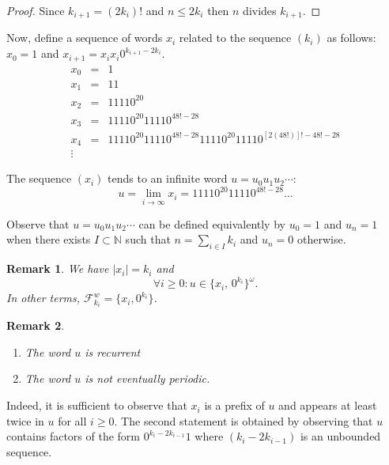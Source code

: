\documentclass[a4 paper,12pt]{article}
\newtheorem{remark}{Remark}[section]
\begin{document}
\begin{proof} Since $k_{i+1}= \left(2k_i\right)!$ and $n\leq 2k_i$ then $n$ divides $k_{i+1}$.  \end{proof}

 Now, define a sequence of words $x_i$ related to the sequence  $(k_i)$ as follows: $x_0=1$ and $x_{i+1}=x_ix_i0^{k_{i+1}-2k_{i}}$.  
$$	\begin{array}{lcl}
		x_0&=&1\\
			x_1&=&11\\
			x_2&=&11110^{20}\\
			x_3&=&11110^{20}11110^{48!-28}\\
				x_4&=&11110^{20}11110^{48!-28}11110^{20}11110^{\left[ 2\left(48!\right) \right] !- 48!-28}\\
			\vdots
		\end{array}$$
		
	The sequence	$(x_i)$ tends to an infinite word $u=u_0u_1u_2 \cdots$:
	 $$u=\lim_{i\rightarrow \infty} x_i=11110^{20}11110^{48!-28}\ldots$$ 

 Observe that  $u=u_0u_1u_2\cdots$ can be defined equivalently  by $u_0=1$ and $u_n=1$  when there exists $I\subset \mathbb{N}$ such that $n=\sum_{i\in I} k_i $ and $u_n=0$ otherwise. 

\begin{remark} \label{wind-F_k_i}
We have $|x_i|=k_i$ and  
 $$\forall i\geq 0: u\in \lbrace x_i,\, 0^{k_{i}} \rbrace^{\omega} .$$ 
 In other terms, $\mathcal{F}^{w}_{k_{i}}=\lbrace x_i, 0^{k_{i}}\rbrace$.
 \end{remark}
\begin{remark}
\begin{enumerate}
	\item The word $u$ is recurrent
	\item The word $u$ is not eventually periodic.
\end{enumerate}
 \end{remark}
 
Indeed, it is sufficient to observe that $x_i$ is a prefix of $u$ and appears at least twice  in $u$ for all $i\geq 0$.
The second statement is obtained by observing  that $u$  contains  factors of the form $0^{k_{i}-2k_{i-1}}1$ where $(k_{i}-2k_{i-1})$ is an unbounded sequence.
\end{document}
